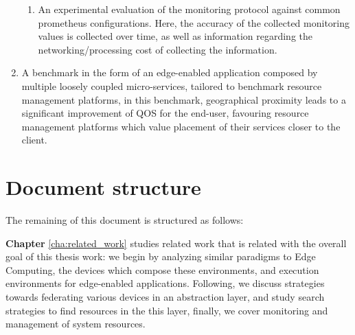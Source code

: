 \begin{enumerate}
{\begin{enumerate}
            \item An experimental evaluation of the monitoring protocol against common prometheus configurations. Here, the accuracy of the collected monitoring values is collected over time, as well as information regarding the networking/processing cost of collecting the information.
            
        \end{enumerate}
        }
    \item A benchmark in the form of an edge-enabled application composed by multiple loosely coupled micro-services, tailored to benchmark resource management platforms, in this benchmark, geographical proximity leads to a significant improvement of QOS for the end-user, favouring resource management platforms which value placement of their services closer to the client.
    
\end{enumerate}

\section{Document structure}

The remaining of this document is structured as follows: 

\textbf{Chapter} \ref{cha:related_work} studies related work that is related with the overall goal of this thesis work: we begin by analyzing similar paradigms to Edge Computing, the devices which compose these environments, and execution environments for edge-enabled applications. Following, we discuss strategies towards federating various devices in an abstraction layer, and study search strategies to find resources in the this layer, finally, we cover monitoring and management of system resources.
